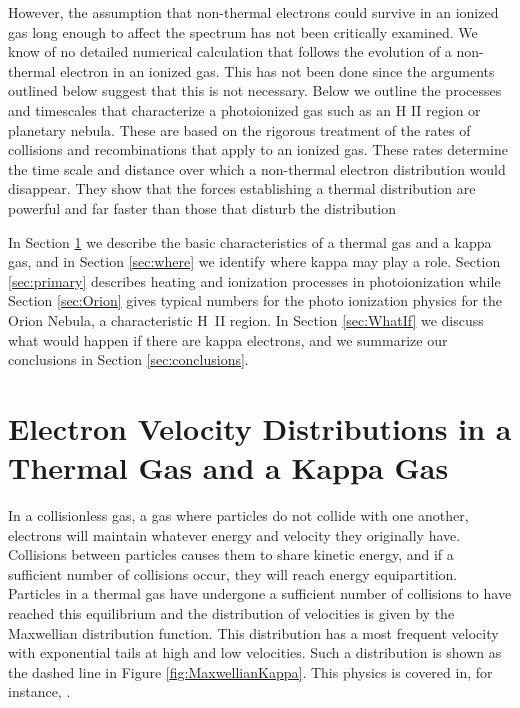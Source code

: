 \documentclass[debug, preprint, twocolumn]{rmaa}
\begin{document}
However, the  assumption that non-thermal electrons 
could survive in an ionized gas long enough to affect the spectrum  
has not been critically examined.
We know of no detailed numerical calculation that follows the evolution of a 
non-thermal electron in an ionized gas. 
This has not been done since the arguments outlined below suggest that this is not necessary. 
Below we outline the processes and timescales that characterize a photoionized gas such 
as an H II region or planetary nebula.  
These are based on the rigorous treatment of the rates of collisions and recombinations 
that apply to an  ionized gas.
These rates determine the time scale and distance over which a non-thermal 
electron distribution would disappear.
They show that the forces establishing a thermal distribution are powerful and 
far faster than those that disturb the distribution

In Section \ref{sec:ThermalAndKappa} we describe the basic characteristics of 
a thermal gas and a kappa gas, and in Section \ref{sec:where} we identify where kappa may play a role.
Section \ref{sec:primary} describes heating and ionization processes in photoionization
while Section \ref{sec:Orion}  gives typical numbers for the photo ionization physics 
for the Orion Nebula, a characteristic H~II region. 
In Section \ref{sec:WhatIf} we discuss what would happen if there are kappa electrons, 
and we summarize our conclusions in Section \ref{sec:conclusions}.

\section{Electron Velocity Distributions in a Thermal Gas and a Kappa Gas}
\label{sec:ThermalAndKappa}

In a collisionless gas, a gas where particles do not collide with one another,
electrons will maintain whatever energy and velocity they originally have.
Collisions between particles causes them to share kinetic energy, and if a sufficient number
of collisions occur, they will reach energy equipartition.
Particles in a thermal gas have undergone a sufficient number of collisions to have reached this equilibrium
and the distribution of velocities is  given by the Maxwellian distribution function. 
This distribution has a most frequent velocity with exponential tails at high and low velocities. 
Such a distribution is shown as the dashed line in Figure \ref{fig:MaxwellianKappa}.
This physics is covered in, for instance, \citet{Spitzer1962}.
\end{document}
